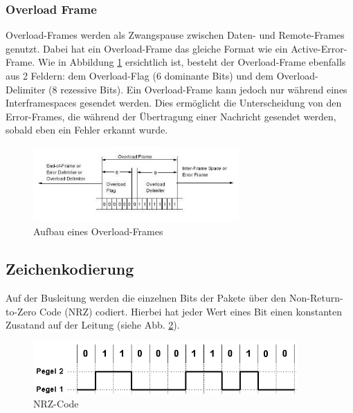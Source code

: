 \subsubsection{Overload Frame} Overload-Frames werden als Zwangspause
zwischen Daten- und Remote-Frames genutzt. Dabei hat ein
Overload-Frame das gleiche Format wie ein Active-Error-Frame. Wie in
Abbildung \ref{overload} ersichtlich ist, besteht der Overload-Frame
ebenfalls aus 2 Feldern: dem Overload-Flag (6 dominante Bits) und dem
Overload-Delimiter (8 rezessive Bits). Ein Overload-Frame kann jedoch
nur während eines Interframespaces gesendet werden. Dies ermöglicht
die Unterscheidung von den Error-Frames, die während der Übertragung
einer Nachricht gesendet werden, sobald eben ein Fehler erkannt wurde.

	
\begin{figure}[h] 
\centering
\includegraphics[width=0.7\textwidth]{figures/overload-frame}
\caption{Aufbau eines Overload-Frames \citep{CBM}} 
\label{overload}
\end{figure} 
	
\subsection{Zeichenkodierung}
	
Auf der Busleitung werden die einzelnen Bits der Pakete über den 
Non-Return-to-Zero Code (NRZ) codiert. Hierbei hat jeder Wert eines Bit 
einen konstanten Zusatand auf der Leitung (siehe Abb. \ref{nrzcode}).

\begin{figure}[h] 
\centering
\includegraphics[width=0.9\textwidth]{figures/nrzcode}
\caption{NRZ-Code \citep{NRZ}} 
\label{nrzcode}
\end{figure} 

